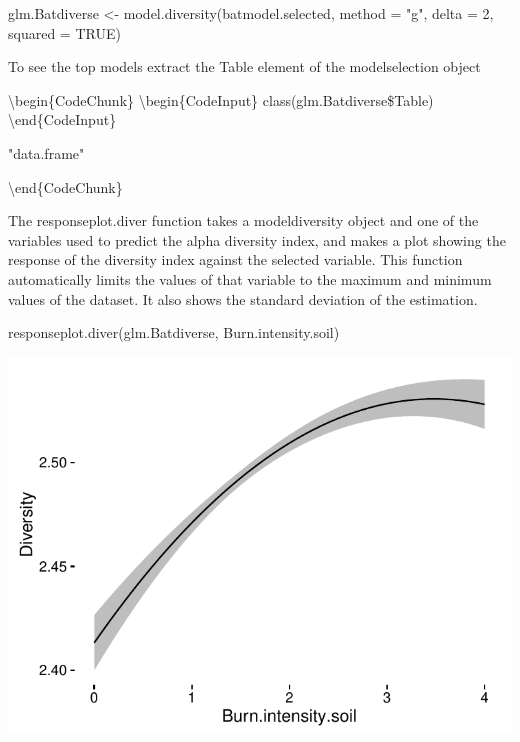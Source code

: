 \documentclass[article]{jss}
\begin{document}
\begin{CodeChunk}
\begin{CodeInput}
glm.Batdiverse <- model.diversity(batmodel.selected, method = "g", delta = 2,
squared = TRUE)
\end{CodeInput}
\end{CodeChunk}

To see the top models extract the Table element of the modelselection
object

\textbackslash{}begin\{CodeChunk\} \textbackslash{}begin\{CodeInput\}
class(glm.Batdiverse\$Table) \textbackslash{}end\{CodeInput\}

\begin{CodeOutput}
[1] "data.frame"
\end{CodeOutput}

\textbackslash{}end\{CodeChunk\}

The responseplot.diver function takes a modeldiversity object and one of
the variables used to predict the alpha diversity index, and makes a
plot showing the response of the diversity index against the selected
variable. This function automatically limits the values of that variable
to the maximum and minimum values of the dataset. It also shows the
standard deviation of the estimation.

\begin{CodeChunk}
\begin{CodeInput}
responseplot.diver(glm.Batdiverse, Burn.intensity.soil)
\end{CodeInput}


\begin{center}\includegraphics{diversityocc_files/figure-latex/unnamed-chunk-19-1} \end{center}

\end{CodeChunk}
\end{document}
